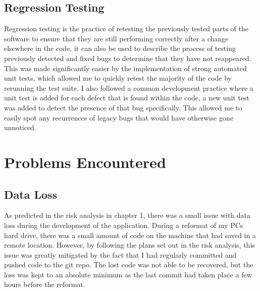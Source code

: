 \subsection{Regression Testing}
Regression testing is the practice of retesting the previously tested parts of the software to ensure that they are still performing correctly after a change elsewhere in the code, it can also be used to describe the process of testing previously detected and fixed bugs to determine that they have not reappeared.
This was made significantly easier by the implementation of strong automated unit tests, which allowed me to quickly retest the majority of the code by rerunning the test suite.
I also followed a common development practice where a unit test is added for each defect that is found within the code, a new unit test was added to detect the presence of that bug specifically. 
This allowed me to easily spot any recurrences of legacy bugs that would have otherwise gone unnoticed.

\section{Problems Encountered}
\subsection{Data Loss}
As predicted in the risk analysis in chapter 1, there was a small issue with data loss during the development of the application.
During a reformat of my PCs hard drive, there was a small amount of code on the machine that had saved in a remote location.
However, by following the plans set out in the risk analysis, this issue was greatly mitigated by the fact that I had regularly committed and pushed code to the git repo. 
The lost code was not able to be recovered, but the loss was kept to an absolute minimum as the last commit had taken place a few hours before the reformat.